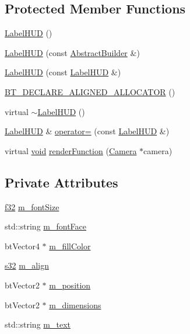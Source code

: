 \subsection*{Protected Member Functions}
\begin{DoxyCompactItemize}
\item 
\mbox{\hyperlink{classnjli_1_1_label_h_u_d_a8b2fa2f2b349bf0f426a29b88816c61b}{Label\+H\+UD}} ()
\item 
\mbox{\hyperlink{classnjli_1_1_label_h_u_d_aec37b679f1007bef302e96521d4bf793}{Label\+H\+UD}} (const \mbox{\hyperlink{classnjli_1_1_abstract_builder}{Abstract\+Builder}} \&)
\item 
\mbox{\hyperlink{classnjli_1_1_label_h_u_d_a0ac0ceb62be175dd54166581c1e78d9e}{Label\+H\+UD}} (const \mbox{\hyperlink{classnjli_1_1_label_h_u_d}{Label\+H\+UD}} \&)
\item 
\mbox{\hyperlink{classnjli_1_1_label_h_u_d_addf0c42945b248883022f2701c9ad690}{B\+T\+\_\+\+D\+E\+C\+L\+A\+R\+E\+\_\+\+A\+L\+I\+G\+N\+E\+D\+\_\+\+A\+L\+L\+O\+C\+A\+T\+OR}} ()
\item 
virtual \mbox{\hyperlink{classnjli_1_1_label_h_u_d_a89455c0039675a892a8f01dccfe7d89d}{$\sim$\+Label\+H\+UD}} ()
\item 
\mbox{\hyperlink{classnjli_1_1_label_h_u_d}{Label\+H\+UD}} \& \mbox{\hyperlink{classnjli_1_1_label_h_u_d_ae4a370ed6012f63081797ee083d4976c}{operator=}} (const \mbox{\hyperlink{classnjli_1_1_label_h_u_d}{Label\+H\+UD}} \&)
\item 
virtual \mbox{\hyperlink{_thread_8h_af1e856da2e658414cb2456cb6f7ebc66}{void}} \mbox{\hyperlink{classnjli_1_1_label_h_u_d_a40fae179595de9d7d29bdd7bc9fbbcf7}{render\+Function}} (\mbox{\hyperlink{classnjli_1_1_camera}{Camera}} $\ast$camera)
\end{DoxyCompactItemize}
\subsection*{Private Attributes}
\begin{DoxyCompactItemize}
\item 
\mbox{\hyperlink{_util_8h_a5f6906312a689f27d70e9d086649d3fd}{f32}} \mbox{\hyperlink{classnjli_1_1_label_h_u_d_ac38777c0a4111605ecca48e4a971c760}{m\+\_\+font\+Size}}
\item 
std\+::string \mbox{\hyperlink{classnjli_1_1_label_h_u_d_a58e6540e10e48a118af8581222acc25f}{m\+\_\+font\+Face}}
\item 
bt\+Vector4 $\ast$ \mbox{\hyperlink{classnjli_1_1_label_h_u_d_a13d1c6df859379202a8986ac7097700b}{m\+\_\+fill\+Color}}
\item 
\mbox{\hyperlink{_util_8h_aa62c75d314a0d1f37f79c4b73b2292e2}{s32}} \mbox{\hyperlink{classnjli_1_1_label_h_u_d_a2f9f7352660b1574a4e715454aa1a7b9}{m\+\_\+align}}
\item 
bt\+Vector2 $\ast$ \mbox{\hyperlink{classnjli_1_1_label_h_u_d_ae242434778593a15db9e3f34555d42a8}{m\+\_\+position}}
\item 
bt\+Vector2 $\ast$ \mbox{\hyperlink{classnjli_1_1_label_h_u_d_aae09e316a6c205adf6620d3a576a7657}{m\+\_\+dimensions}}
\item 
std\+::string \mbox{\hyperlink{classnjli_1_1_label_h_u_d_a0e917cde3ec783326e76033b11a6a0d4}{m\+\_\+text}}
\end{DoxyCompactItemize}
